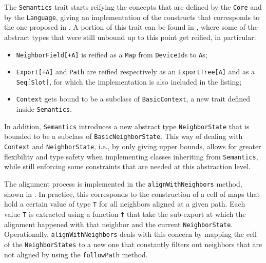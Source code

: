 The \texttt{Semantics} trait starts reifying the concepts that are defined by the \texttt{Core} and by the \texttt{Language}, giving an implementation of the constructs that corresponds to the one proposed in .
%
A portion of this trait can be found in , where some of the abstract types that were still unbound up to this point get reified, in particular:
%
\begin{itemize}
    \item \texttt{NeighborField[+A]} is reified as a \texttt{Map} from \texttt{DeviceId}s to \texttt{A}s;
    \item \texttt{Export[+A]} and \texttt{Path} are reified respectively as an \texttt{ExportTree[A]} and as a \texttt{Seq[Slot]}, for which the implementation is also included in the listing;
    \item \texttt{Context} gets bound to be a subclass of \texttt{BasicContext}, a new trait defined inside \texttt{Semantics}.
\end{itemize}
%
In addition, \texttt{Semantics} introduces a new abstract type \texttt{NeighborState} that is bounded to be a subclass of \texttt{BasicNeighborState}.
%
This way of dealing with \texttt{Context} and \texttt{NeighborState}, i.e., by only giving upper bounds, allows for greater flexibility and type safety when implementing classes inheriting from \texttt{Semantics}, while still enforcing some constraints that are needed at this abstraction level.
%


The alignment process is implemented in the \texttt{alignWithNeighbors} method, shown in .
%
In practice, this corresponds to the construction of a cell of maps that hold a certain value of type \texttt{T} for all neighbors aligned at a given path.
%
Each value \texttt{T} is extracted using a function \texttt{f} that take the sub-export at which the alignment happened with that neighbor and the current \texttt{NeighborState}.
%
Operationally, \texttt{alignWithNeighbors} deals with this concern by mapping the cell of the \texttt{NeighborStates} to a new one that constantly filters out neighbors that are not aligned by using the \texttt{followPath} method.
%


